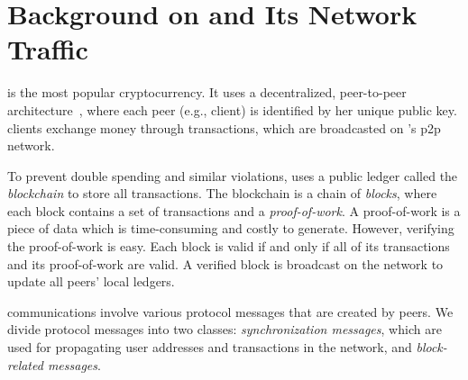 \section{Background on \bc and Its Network Traffic}\label{sec:back}


\bc is the most popular cryptocurrency. It uses  a decentralized, peer-to-peer architecture~\cite{nakamoto2008bitcoin}, where each peer (e.g., client) is identified by her unique public key.  
	\bc clients exchange money through \bc transactions, which are  broadcasted on \bc's p2p network. 

	To prevent double spending and similar violations, \bc uses a public ledger called the \emph{blockchain} to store all \bc transactions. The blockchain is a chain of \emph{blocks}, where  each block contains a set of transactions and a \textit{proof-of-work}. A proof-of-work is a piece of data which is time-consuming and costly to generate. However, verifying the proof-of-work is easy. Each block is valid if and only if all of its transactions and its proof-of-work are valid. A verified block is broadcast on the network to update all peers' local ledgers. 

	 \bc communications involve various protocol messages that are created by \bc peers. 
	 We divide \bc protocol messages into two classes: \emph{synchronization messages},  which are used for  propagating user addresses and transactions in the \bc network, and \emph{block-related messages}.%
	
